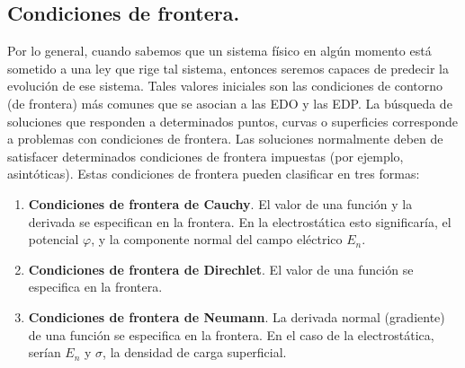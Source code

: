 \subsection{Condiciones de frontera.}
Por lo general, cuando sabemos que un sistema físico en algún momento está sometido a una ley que rige tal sistema, entonces seremos capaces de predecir la evolución de ese sistema. Tales valores iniciales son las condiciones de contorno (de frontera) más comunes que se asocian a las EDO y las EDP. La búsqueda de soluciones que responden a determinados puntos, curvas o superficies corresponde a problemas con condiciones de frontera. Las soluciones normalmente deben de satisfacer determinados condiciones de frontera impuestas (por ejemplo, asintóticas). Estas condiciones de frontera pueden clasificar en tres formas:
\begin{enumerate}
\item \textbf{Condiciones de frontera de Cauchy}. El valor de una función y la derivada se especifican en la frontera. En la electrostática esto significaría, el potencial $\varphi$, y la componente normal del campo eléctrico $E_{n}$.
\item \textbf{Condiciones de frontera de Direchlet}. El valor de una función se especifica en la frontera.
\item \textbf{Condiciones de frontera de Neumann}. La derivada normal (gradiente) de una función se especifica en la frontera. En el caso de la electrostática, serían $E_{n}$ y $\sigma$, la densidad de carga superficial.
\end{enumerate}
